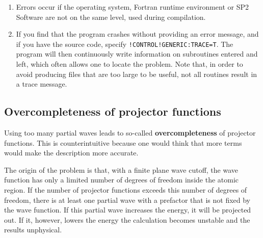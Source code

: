 \documentclass[final,12pt,makeidx,DIV=calc]{article}
\begin{document}
{{{{{{\begin{enumerate}
  Library should give a useful message (affects only the parallel
  version).
\item Errors occur if the operating system, Fortran runtime
  environment or SP2 Software are not on the same level, 
  used during compilation.
\item If you find that the program crashes without providing an error
  message, and if you have the source code, specify
  \verb|!CONTROL!GENERIC:TRACE=T|. The program will then
  continuously write information on subroutines entered and left,
  which often allows one to locate the problem. Note that, in order to
  avoid producing files that are too large to be useful, not all routines
  result in a trace message.   %
\end{enumerate}


\subsection{Overcompleteness of projector functions}
Using too many partial waves leads to so-called
\textbf{overcompleteness} of projector
functions.  This is counterintuitive because one would think that more
terms would make the description more accurate. 

The origin of the problem is that, with a finite plane wave cutoff,
the wave function has only a limited number of degrees of freedom
inside the atomic region. If the number of projector functions
exceeds this number of degrees of freedom, there is at least one
partial wave with a prefactor that is not fixed by the wave function.
If this partial wave increases the energy, it will be projected
out. If it, however, lowers the energy the calculation becomes
unstable and the results unphysical.

}}}}}}
\end{document}
